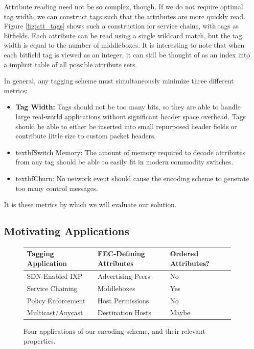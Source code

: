 Attribute reading need not be so complex, though. If we do not require optimal tag width, we can construct tags such that the attributes are more quickly read. Figure \ref{fig:att_tags} shows such a construction for service chains, with tags as bitfields. Each attribute can be read using a single wildcard match, but the tag width is equal to the number of middleboxes. It is interesting to note that when each bitfield tag is viewed as an integer, it can still be thought of as an index into a implicit table of all possible attribute sets. 

In general, any tagging scheme must simultaneously minimize three different metrics:
\begin{itemize}
\item{\textbf{Tag Width:} Tags should not be too many bits, so they are able to handle large real-world applications without significant header space overhead. Tags should be able to either be inserted into small repurposed header fields or contribute little size to custom packet headers. }
\item{textbf{Switch Memory:} The amount of memory required to decode attributes from any tag should be able to easily fit in modern commodity switches.}
\item{textbf{Churn:} No network event should cause the encoding scheme to generate too many control messages.}
\end{itemize}
It is these metrics by which we will evaluate our solution. 


\subsection{Motivating Applications}
\begin{figure}
    \begin{tabular}{| p{2.5cm} | p{2cm} | p{2cm} |}
    \hline
    Tagging Application & FEC-Defining Attributes & Ordered Attributes?\\ \hline
    SDN-Enabled IXP & Advertising Peers & No \\ \hline
    Service Chaining & Middleboxes& Yes \\ \hline
    Policy Enforcement & Host Permissions & No \\ \hline
    Multicast/Anycast & Destination Hosts & Maybe \\
    \hline
    \end{tabular}
    \caption{Four applications of our encoding scheme, and their relevant properties. } 
    \label{tab:applications}
\end{figure}

